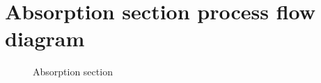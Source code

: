 \chapter{Absorption section process flow diagram} %
\begin{figure}[t]
\centering
{}
\caption{Absorption section}
\label{absorption}
\end{figure}
\label{AppendixB} %




